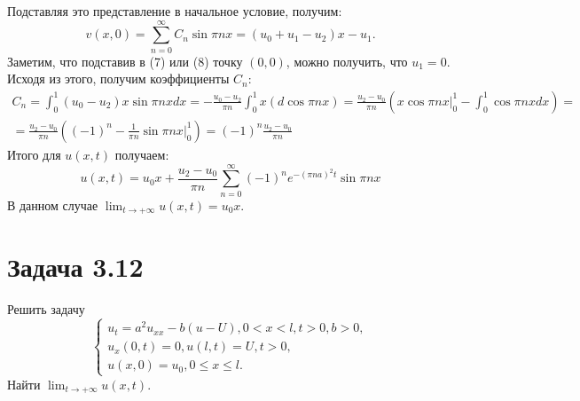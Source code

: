\documentclass[11pt]{article}
\begin{document}
Подставляя это представление в начальное условие, получим:
\begin{equation*}
v(x, 0) = \sum_{n = 0}^{\infty}C_n\sin\pi nx = (u_0 + u_1 - u_2)x - u_1.
\end{equation*}
Заметим, что подставив в (7) или (8) точку $(0, 0)$, можно получить, что $u_1 = 0$.
Исходя из этого, получим коэффициенты $C_n$:
\begin{multline*}
C_n = \int_0^1(u_0 - u_2)x\sin\pi nxdx = -\frac{u_0 - u_2}{\pi n}\int_0^1x(d\cos\pi nx) =
\frac{u_2 - u_0}{\pi n}(x\cos\pi nx|_0^1 - \int_0^1\cos\pi nxdx) = \\
= \frac{u_2 - u_0}{\pi n}\left((-1)^n - \frac1{\pi n}\sin\pi nx|_0^1\right) =
(-1)^n\frac{u_2 - u_0}{\pi n}
\end{multline*}
Итого для $u(x, t)$ получаем:
\begin{equation}
u(x, t) = u_0x + \frac{u_2 - u_0}{\pi n}\sum_{n = 0}^{\infty}(-1)^ne^{-(\pi na)^2t}\sin{\pi nx}
\end{equation}
В данном случае $\lim_{t \to +\infty}u(x, t) = u_0x$.
\section{Задача 3.12}
\label{sec:orga655241}
Решить задачу
\begin{equation}
\begin{cases}
u_t = a^2u_{xx} - b(u - U), 0 < x < l, t > 0, b > 0, \\
u_x(0, t) = 0, u(l, t) = U, t > 0, \\
u(x, 0) = u_0, 0 \leq x \leq l.
\end{cases}
\end{equation}
Найти $\lim_{t \to +\infty}u(x, t)$.
\end{document}
